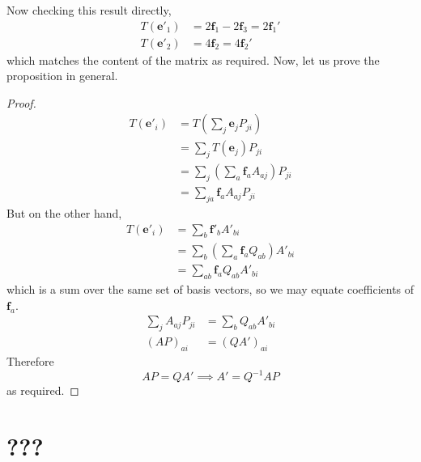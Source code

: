 \documentclass{article}
\begin{document}
Now checking this result directly,
\begin{align*}
	T(\bm e'_1) & = 2\bm f_1 - 2\bm f_3 = 2\bm f_1' \\
	T(\bm e'_2) & = 4\bm f_2 = 4\bm f_2'
\end{align*}
which matches the content of the matrix as required. Now, let us prove the proposition in general.
\begin{proof}
	\begin{align*}
		T(\bm e'_i) & = T\left( \sum_j \bm e_j P_{ji} \right)              \\
		            & = \sum_j T(\bm e_j) P_{ji}                           \\
		            & = \sum_j \left( \sum_a \bm f_a A_{aj} \right) P_{ji} \\
		            & = \sum_{ja} \bm f_a A_{aj} P_{ji}
	\end{align*}
	But on the other hand,
	\begin{align*}
		T(\bm e'_i) & = \sum_b \bm f'_b A'_{bi}                             \\
		            & = \sum_b \left( \sum_a \bm f_a Q_{ab} \right) A'_{bi} \\
		            & = \sum_{ab} \bm f_a Q_{ab} A'_{bi}
	\end{align*}
	which is a sum over the same set of basis vectors, so we may equate coefficients of $\bm f_a$.
	\begin{align*}
		\sum_j A_{aj} P_{ji} & = \sum_b Q_{ab} A'_{bi} \\
		(AP)_{ai}            & = (QA')_{ai}
	\end{align*}
	Therefore
	\[ AP = QA' \implies A' = Q^{-1}AP \]
	as required.
\end{proof}

\section{???}
\end{document}

